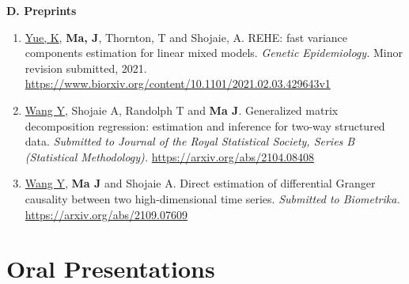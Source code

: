 \documentclass[10pt]{article}
\begin{document}
\textbf{D.  Preprints}
\begin{enumerate}
\item \underline{Yue, K}, \textbf{Ma, J}, Thornton, T and Shojaie, A. REHE: fast variance components estimation for linear mixed models. {\it Genetic Epidemiology.} Minor revision submitted, 2021. \url{https://www.biorxiv.org/content/10.1101/2021.02.03.429643v1}
\item \underline{Wang Y}, Shojaie A, Randolph T and \textbf{Ma J}. Generalized matrix decomposition regression: estimation and inference for two-way structured data. {\it Submitted to Journal of the Royal Statistical Society, Series B (Statistical Methodology).} \url{https://arxiv.org/abs/2104.08408}
\item \underline{Wang Y}, \textbf{Ma J} and Shojaie A. Direct estimation of differential Granger causality between two high-dimensional time series. {\it Submitted to Biometrika.} \url{https://arxiv.org/abs/2109.07609}
\end{enumerate}

%


\section*{Oral Presentations}
\end{document}

